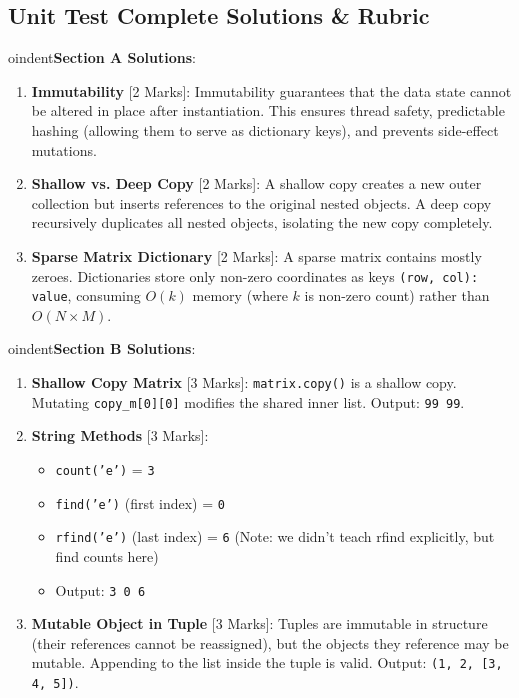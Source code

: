 \subsection{Unit Test Complete Solutions \& Rubric}

\begin{solutionbox}

oindent\textbf{Section A Solutions}:
\begin{enumerate}
    \item \textbf{Immutability} [2 Marks]: Immutability guarantees that the data state cannot be altered in place after instantiation. This ensures thread safety, predictable hashing (allowing them to serve as dictionary keys), and prevents side-effect mutations.
    \item \textbf{Shallow vs. Deep Copy} [2 Marks]: A shallow copy creates a new outer collection but inserts references to the original nested objects. A deep copy recursively duplicates all nested objects, isolating the new copy completely.
    \item \textbf{Sparse Matrix Dictionary} [2 Marks]: A sparse matrix contains mostly zeroes. Dictionaries store only non-zero coordinates as keys \texttt{(row, col): value}, consuming $O(k)$ memory (where $k$ is non-zero count) rather than $O(N \times M)$.
\end{enumerate}


oindent\textbf{Section B Solutions}:
\begin{enumerate}[start=4]
    \item \textbf{Shallow Copy Matrix} [3 Marks]: \texttt{matrix.copy()} is a shallow copy. Mutating \texttt{copy\_m[0][0]} modifies the shared inner list. Output: \texttt{99 99}.
    \item \textbf{String Methods} [3 Marks]:
    \begin{itemize}
        \item \texttt{count('e')} = \texttt{3}
        \item \texttt{find('e')} (first index) = \texttt{0}
        \item \texttt{rfind('e')} (last index) = \texttt{6}  (Note: we didn't teach rfind explicitly, but find counts here)
        \item Output: \texttt{3 0 6}
    \end{itemize}
    \item \textbf{Mutable Object in Tuple} [3 Marks]: Tuples are immutable in structure (their references cannot be reassigned), but the objects they reference may be mutable. Appending to the list inside the tuple is valid. Output: \texttt{(1, 2, [3, 4, 5])}.
\end{enumerate}



\end{solutionbox}
